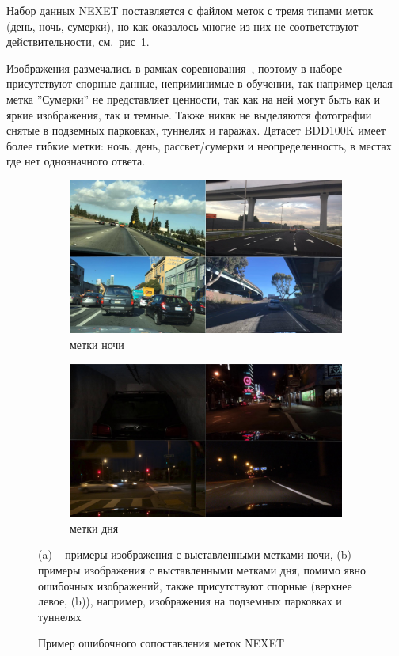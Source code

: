 \documentclass[11pt,a4paper]{extarticle}
\begin{document}
{			Набор данных NEXET поставляется с файлом меток  с тремя типами меток (день, ночь, сумерки), но как оказалось многие из них не соответствуют действительности, см.~рис~\ref{pic:nexet_mis}.
			
			\noindent
			Изображения размечались в рамках соревнования~\cite{data:nexet}, поэтому в наборе присутствуют спорные данные, неприминимые в обучении, так например целая метка ''Сумерки'' не представляет ценности, так как на ней могут быть как и яркие изображения, так и темные.
			Также никак не выделяются фотографии снятые в подземных парковках, туннелях и гаражах.
			Датасет BDD100K имеет более гибкие метки: ночь, день, рассвет/сумерки и неопределенность, в местах где нет однозначного ответа.

			\begin{figure}[ht]
				\centering
				\begin{subfigure}[ht]{0.49\textwidth}
					\includegraphics[width=\textwidth]{img/nexet_mis_night}
					\caption{метки ночи}
				\end{subfigure}
				\begin{subfigure}[ht]{0.49\textwidth}
					\includegraphics[width=\textwidth]{img/nexet_mis_day}
					\caption{метки дня}
				\end{subfigure}
				\caption{Пример ошибочного сопоставления меток NEXET}{
					\small{
					(a) -- примеры изображения с выставленными метками ночи,
					(b) -- примеры изображения с выставленными метками дня, помимо явно ошибочных изображений, также присутствуют спорные (верхнее левое, (b)), например, изображения на подземных парковках и туннелях
				}}
				\label{pic:nexet_mis}
			\end{figure}

}
\end{document}
